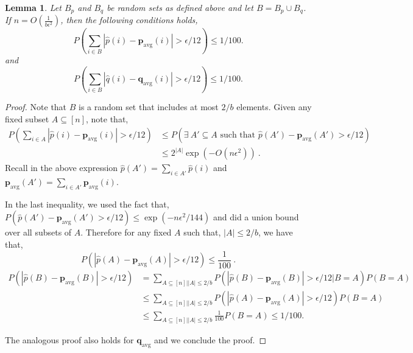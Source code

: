 \documentclass[10pt]{article} %
\theoremstyle{plain}
\newtheorem{lemma}[theorem]{Lemma}
\newcommand{\bp}{\textbf{p}}
\newcommand{\bq}{\textbf{q}}
\newcommand{\avg}{\mathrm{avg}}
\begin{document}
\begin{lemma}\label{lem:111}
	Let $B_p$ and $B_{q}$ be random sets as defined above and let $B = B_{p}\cup B_{q}$. If $n=O(\frac{1}{b\epsilon^2})$, then the following conditions holds, 
	$$P(\sum_{i \in B}|\widehat{p}(i) - \bp_{\avg}(i)| > \epsilon/12) \leq 1/100.$$ and $$P(\sum_{i \in B}|\widehat{q}(i) - \bq_{\avg}(i)| > \epsilon/12) \leq 1/100.$$
\end{lemma}
\begin{proof}
	Note that $B$ is a random set that includes at most $2/b$ elements. Given any fixed subset $A \subseteq [n]$, note that,
	\begin{align*}
		P(\sum_{i \in A}|\widehat{p}(i) - \bp_{\avg}(i)| > \epsilon/12) &  \le P(\exists ~A' \subseteq A \text{ such that }\widehat{p}(A') - \bp_{\avg}(A') > \epsilon/12)\\
		& \leq 2^{|A|} \exp(-O(n \epsilon^2))~.
	\end{align*}
	Recall in the above expression $\widehat{p}(A') = \sum_{i \in A'}\widehat{p}(i)$ and $\bp_{\avg}(A') = \sum_{i \in A'}\bp_{\avg}(i)$.
	
	In the last inequality, we used the fact that,
	$P(\widehat{p}(A') - \bp_{\avg}(A') > \epsilon/12) \leq \exp(-n \epsilon^2/144)$ and did a union bound over all subsets of $A$.
	Therefore for any fixed $A$ such that, $|A| \leq 2/b$, we have that,
	$$ P(|\widehat{p}(A) - \bp_{\avg}(A)| > \epsilon/12) \leq \frac{1}{100}~.$$
	\begin{align}
		P(|\widehat{p}(B) - \bp_{\avg}(B)| > \epsilon/12) & = \sum_{A \subseteq [n]||A| \leq 2/b}    P(|\widehat{p}(B) - \bp_{\avg}(B)| > \epsilon/12|B=A) P(B=A)\\
		&\leq \sum_{A \subseteq [n]||A| \leq 2/b}    P(|\widehat{p}(A) - \bp_{\avg}(A)| > \epsilon/12) P(B=A)\\
		& \leq \sum_{A \subseteq [n]||A| \leq 2/b}    \frac{1}{100} P(B=A) \leq 1/100.
	\end{align}
	
	The analogous proof also holds for $\bq_{\avg}$ and we conclude the proof.
\end{proof}
\end{document}
